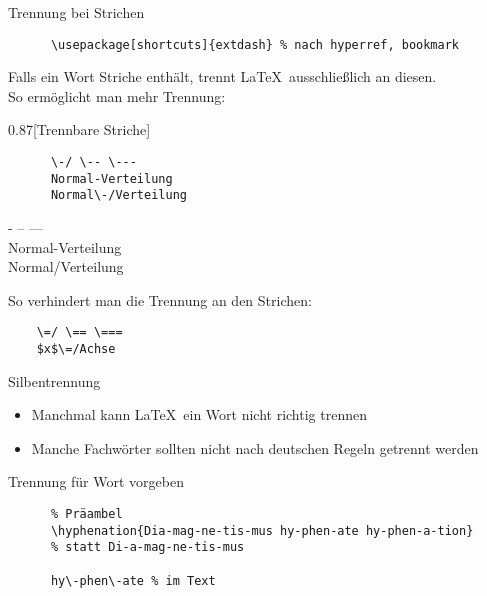\begin{frame}[fragile]{Trennung bei Strichen}
  \vspace*{-2em}
  \begin{Packages}
    \begin{lstlisting}
      \usepackage[shortcuts]{extdash} % nach hyperref, bookmark
    \end{lstlisting}
  \end{Packages}

  Falls ein Wort Striche enthält, trennt \LaTeX\ ausschließlich an diesen.\\
  So ermöglicht man mehr Trennung:
  \vspace{-0.5em}
  \begin{CodeExample}{0.87}[Trennbare Striche]
    \begin{lstlisting}
      \-/ \-- \---
      Normal-Verteilung
      Normal\-/Verteilung
    \end{lstlisting}
  \CodeResult
    \strut
    - -- --- \\
    Normal-Verteilung \\
    Normal\-/Verteilung
  \end{CodeExample}

  So verhindert man die Trennung an den Strichen:
  \begin{lstlisting}
    \=/ \== \===
    $x$\=/Achse
  \end{lstlisting}
\end{frame}

\begin{frame}[fragile]{Silbentrennung}
  \begin{itemize}
    \item Manchmal kann \LaTeX\ ein Wort nicht richtig trennen
    \item Manche Fachwörter sollten nicht nach deutschen Regeln getrennt werden
  \end{itemize}
  \begin{block}{Trennung für Wort vorgeben}
    \begin{lstlisting}
      % Präambel
      \hyphenation{Dia-mag-ne-tis-mus hy-phen-ate hy-phen-a-tion}
      % statt Di-a-mag-ne-tis-mus

      hy\-phen\-ate % im Text
    \end{lstlisting}
  \end{block}
\end{frame}
